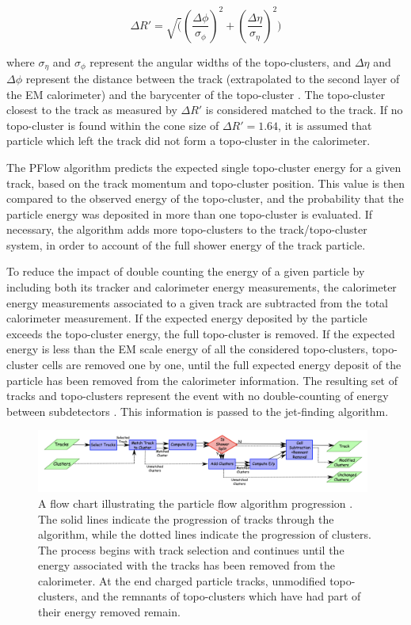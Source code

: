 \begin{equation}
	\Delta R' = \sqrt( (\frac{\Delta\phi}{\sigma_\phi})^2 + (\frac{\Delta\eta}{\sigma_\eta})^2 )
\end{equation}

where $\sigma_\eta$ and $\sigma_\phi$ represent the angular widths of the topo-clusters, and $\Delta\eta$ and $\Delta\phi$ represent the distance between the track (extrapolated to the second layer of the EM calorimeter) and the barycenter of the topo-cluster \cite{pflow}. The topo-cluster closest to the track as measured by $\Delta R'$ is considered matched to the track. If no topo-cluster is found within the cone size of $\Delta R' = 1.64$, it is assumed that particle which left the track did not form a topo-cluster in the calorimeter. \par 

The PFlow algorithm predicts the expected single topo-cluster energy for a given track, based on the track momentum and topo-cluster position. This value is then compared to the observed energy of the topo-cluster, and the probability that the particle energy was deposited in more than one topo-cluster is evaluated. If necessary, the algorithm adds more topo-clusters to the track/topo-cluster system, in order to account of the full shower energy of the track particle. \par

To reduce the impact of double counting the energy of a given particle by including both its tracker and calorimeter energy measurements, the calorimeter energy measurements associated to a given track are subtracted from the total calorimeter measurement. If the expected energy deposited by the particle exceeds the topo-cluster energy, the full topo-cluster is removed. If the expected energy is less than the EM scale energy of all the considered topo-clusters, topo-cluster cells are removed one by one, until the full expected energy deposit of the particle has been removed from the calorimeter information. The resulting set of tracks and topo-clusters represent the event with no double-counting of energy between subdetectors \cite{pflow}. This information is passed to the jet-finding algorithm.

\begin{figure}[h]
        \centering
	\includegraphics[width=0.98\textwidth]{figures/ch5/pflow_diagram}
	\caption{ A flow chart illustrating the particle flow algorithm progression \cite{pflow}. The solid lines indicate the progression of tracks through the algorithm, while the dotted lines indicate the progression of clusters. The process begins with track selection and continues until the energy associated with the tracks has been removed from the calorimeter. At the end charged particle tracks, unmodified topo-clusters, and the remnants of topo-clusters which have had part of their energy removed remain. }
	\label{fig:pflow_diagram}
\end{figure}

